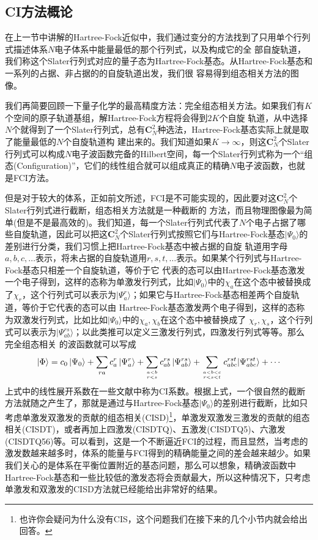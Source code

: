 \documentclass[12pt,a4paper,openany,twoside]{book}
\numberwithin{equation}{section}
\begin{document}
        \subsection{CI方法概论}
          在上一节中讲解的Hartree-Fock近似中，我们通过变分的方法找到了只用单个行列式描述体系$N$电子体系中能量最低的那个行列式，以及构成它的全 部自旋轨道，我们称这个Slater行列式对应的量子态为Hartree-Fock基态。从Hartree-Fock基态和一系列的占据、非占据的的自旋轨道出发，我们很 容易得到组态相关方法的图像。

          我们再简要回顾一下量子化学的最高精度方法：完全组态相关方法。如果我们有$K$个空间的原子轨道基组，解Hartree-Fock方程将会得到$2K$个自旋 轨道，从中选择$N$个就得到了一个Slater行列式，总有$\mathbf{C}_N^2$种选法，Hartree-Fock基态实际上就是取了能量最低的$N$个自旋轨道构 建出来的。我们知道如果$K\rightarrow\infty$，则这$\mathbf{C}_N^2$个Slater行列式可以构成$N$电子波函数完备的Hilbert空间，每一个Slater行列式称为一个“组态(Configuration)”，它们的线性组合就可以组成真正的精确$N$电子波函数，也就是FCI方法。

          但是对于较大的体系，正如前文所述，FCI是不可能实现的，因此要对这$\mathbf{C}_N^2$个Slater行列式进行截断，组态相关方法就是一种截断的 方法，而且物理图像最为简单(但是不是最高效的)。我们知道，每一个Slater行列式代表了$N$个电子占据了哪些自旋轨道，因此可以把这$\mathbf  {C}_N^2$个Slater行列式按照它们与Hartree-Fock基态$ | \Psi_0 \rangle $的差别进行分类，我们习惯上把Hartree-Fock基态中被占据的自旋  轨道用字母$a,b,c,\dots$表示，将未占据的自旋轨道用$r,s,t,\dots$表示。如果某个行列式与Hartree-Fock基态只相差一个自旋轨道，等价于它  代表的态可以由Hartree-Fock基态激发一个电子得到，这样的态称为单激发行列式，比如$ | \Psi_0 \rangle $中的$\chi_a$在这个态中被替换成  了$\chi_r$，这个行列式可以表示为$| \Psi_a^r\rangle$；如果它与Hartree-Fock基态相差两个自旋轨道，等价于它代表的态可以由 Hartree-Fock基态激发两个电子得到，这样的态称为双激发行列式，比如比如$ | \Psi_0 \rangle $中的$\chi_a,\chi_b$在这个态中被替换成了  $\chi_r,\chi_s$，这个行列式可以表示为$| \Psi_{ab}^{rs}\rangle$；以此类推可以定义三激发行列式，四激发行列式等等。那么完全组态相关  的波函数就可以写成
          \begin{equation}
            |\Phi\rangle= c_{0}\left|\Psi_{0}\right\rangle+\sum_{r a} c_{a}^{r}\left|\Psi_{a}^{r}\right\rangle+\sum_{a<b \atop r<s} c_{a b}^{r s}\left|\Psi_{a b}^{r s}\right\rangle+\sum_{a<b<c \atop r<s<t} c_{a b c}^{r s t}|\Psi_{a b c}^{r s t}\rangle+\cdots
            \label{FCI expansion}
          \end{equation}
          上式中的线性展开系数在一些文献中称为CI系数。根据上式，一个很自然的截断方法就随之产生了，那就是通过与Hartree-Fock基态$ | \Psi_0 \rangle $的差别进行截断，比如只考虑单激发双激发的贡献的组态相关(CISD)\footnote{也许你会疑问为什么没有CIS，这个问题我们在接下来的几个小节内就会给出回答。}，单激发双激发三激发的贡献的组态相关(CISDT)，或者再加上四激发(CISDTQ)、五激发(CISDTQ5)、六激发(CISDTQ56)等。可以看到，这是一个不断逼近FCI的过程，而且显然，当考虑的激发数越来越多时，体系的能量与FCI得到的精确能量之间的差会越来越少。如果我们关心的是体系在平衡位置附近的基态问题，那么可以想象，精确波函数中Hartree-Fock基态和一些比较低的激发态将会贡献最大，所以这种情况下，只考虑单激发和双激发的CISD方法就已经能给出非常好的结果。
\end{document}
